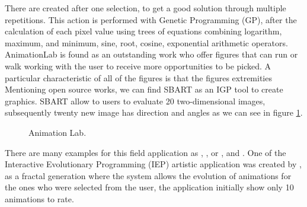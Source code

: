 There are created after one selection, to get a good solution through multiple
repetitions. This action is performed with Genetic Programming (GP), after the
calculation of each pixel value using trees of equations combining logarithm,
maximum, and minimum, sine, root, cosine, exponential arithmetic operators.
AnimationLab is found as an outstanding work who offer figures that can run or
walk working with the user to receive more opportunities to be picked. A
particular characteristic of all of the figures is that the figures extremities
Mentioning open source works, we can find SBART as an IGP
\cite{unemi2000sbart} tool to create graphics. SBART allow to users
to evaluate 20 two-dimensional images, subsequently twenty new image has
direction and angles as we can see in figure \ref{fig:AnimationLab}.

\begin{figure}
\captionsetup{justification=centering,margin=2cm}
\centering
\setlength\fboxsep{0pt}
\setlength\fboxrule{0.7pt}
\caption{Animation Lab.}
\label{fig:AnimationLab}       
\end{figure}

There are many examples for this field application as
\cite{mckenna1990dynamic},
\cite{ventrella1994explorations}, or
\cite{ventrella1995disney}, \cite{lim1999pro} and
\cite{lim2000solve}.  One of the Interactive Evolutionary Programming
(IEP)  artistic application was created by \cite{angeline1996evolving}, as a fractal generation where the system allows the evolution of
animations for the ones who were selected from the user, the application
initially show only 10 animations to rate.


